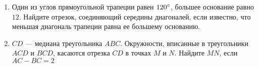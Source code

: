 \documentclass[12pt, a4paper]{article}
\begin{document}
\begin{enumerate}[label=\textbf{\arabic*.}]
		\item Один из углов прямоугольной трапеции равен \( 120\degree \), большее основание равно \( 12 \). Найдите отрезок, соединяющий середины диагоналей, если известно, что меньшая диагональ трапеции равна ее большему основанию.
		
		\item \( CD \) --- медиана треугольника \( ABC \). Окружности, вписанные в треугольники \( ACD \) и \( BCD \), касаются отрезка \( CD \) в точках \( M \) и \( N \). Найдите \( MN \), если \( AC - BC = 2 \)
	\end{enumerate}
\end{document}

